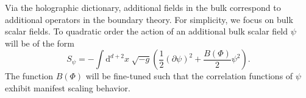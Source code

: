 \documentclass[10pt, oneside]{book}
\begin{document}
\begin{doublespace}
Via the holographic dictionary, additional fields in the bulk correspond to additional operators in the boundary theory.   For simplicity, we focus on %
bulk scalar fields.   %
To quadratic order the action of an additional %
bulk scalar field $\psi$ will be of the form \begin{equation}
S_{\psi} = -\int \mathrm{d}^{d+2}x\; \sqrt{-g} \left(\frac{1}{2}(\partial \psi)^2 + \frac{B(\Phi)}{2}\psi^2\right).
\end{equation}
The function $B(\Phi)$ will be fine-tuned such that the correlation functions of $\psi$ exhibit manifest scaling behavior. 
%



\end{doublespace}
\end{document}
